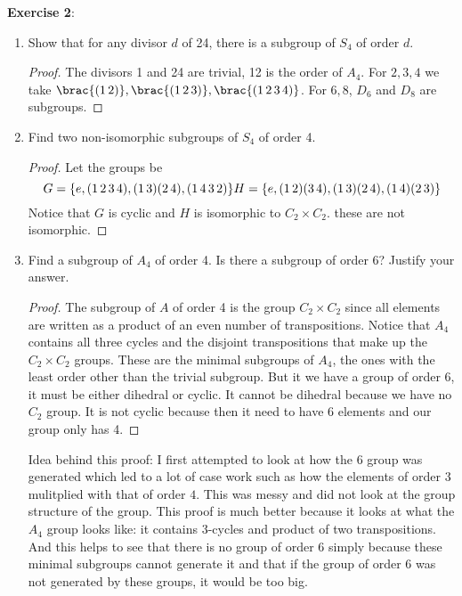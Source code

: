 \documentclass{article}
\begin{document}
\textbf{Exercise 2}:
\begin{enumerate}
	\item Show that for any divisor $d$ of 24, there is a subgroup of $S_{4}$ of order $d$.

		\begin{proof}
			The divisors 1 and 24 are trivial, 12 is the order of $A_{4}$. For $2, 3, 4$ we take $\brac{(1 \, 2)}, \brac{(1 \, 2 \, 3)}, \brac{(1 \, 2 \, 3\, 4)}$. For $6, 8$, $D_{6}$ and $D_{8}$ are subgroups.
		\end{proof}

	\item Find two non-isomorphic subgroups of $S_{4}$ of order 4.

		\begin{proof}
			Let the groups be 
			\begin{equation*}
				G = \{e, (1 \, 2 \, 3 \, 4), (1 \, 3)(2 \, 4), (1 \, 4 \, 3 \, 2)\} \\
				H = \{e, (1 \, 2)(3 \, 4), (1 \, 3)(2 \, 4), (1 \, 4)(2 \, 3)\}
			\end{equation*}
			Notice that $G$ is cyclic and $H$ is isomorphic to $C_{2} \times C_{2}$. these are not isomorphic.
		\end{proof}

	\item Find a subgroup of $A_{4}$ of order 4. Is there a subgroup of order 6? Justify your answer.

		\begin{proof}
			The subgroup of $A$ of order 4 is the group $C_{2} \times C_{2}$ since all elements are written as a product of an even number of transpositions. Notice that $A_{4}$ contains all three cycles and the disjoint transpositions that make up the $C_{2} \times C_{2}$ groups. These are the minimal subgroups of $A_{4}$, the ones with the least order other than the trivial subgroup. But it we have a group of order $6$, it must be either dihedral or cyclic. It cannot be dihedral because we have no $C_{2}$ group. It is not cyclic because then it need to have 6 elements and our group only has 4.   
		\end{proof}

		Idea behind this proof: I first attempted to look at how the 6 group was generated which led to a lot of case work such as how the elements of order $3$ mulitplied with that of order $4$. This was messy and did not look at the group structure of the group. This proof is much better because it looks at what the $A_{4}$ group looks like: it contains 3-cycles and product of two transpositions. And this helps to see that there is no group of order 6 simply because these minimal subgroups cannot generate it and that if the group of order 6 was not generated by these groups, it would be too big.

\end{enumerate}
\end{document}
